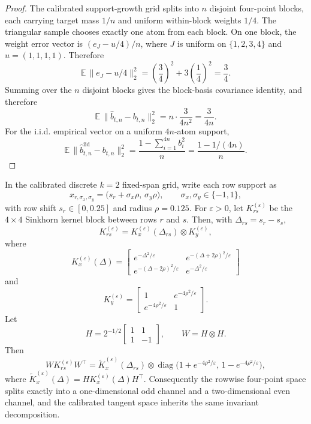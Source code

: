 \begin{proof}
The calibrated support-growth grid splits into $n$ disjoint four-point blocks,
each carrying target mass $1/n$ and uniform within-block weights $1/4$. The
triangular sample chooses exactly one atom from each block. On one block, the
weight error vector is $(e_J-u/4)/n$, where $J$ is uniform on
$\{1,2,3,4\}$ and $u=(1,1,1,1)$. Therefore
\[
  \mathbb E\,\bigl\|e_J-u/4\bigr\|_2^2
  = \left(\frac34\right)^2 + 3\left(\frac14\right)^2
  = \frac34.
\]
Summing over the $n$ disjoint blocks gives
the block-basis covariance identity, and therefore
\[
  \mathbb E\,\|\widehat b_{t,n}-b_{t,n}\|_2^2
  = n\cdot \frac{3}{4n^2}
  = \frac{3}{4n}.
\]
For the i.i.d. empirical vector on a uniform $4n$-atom support,
\[
  \mathbb E\,\|\widehat b_{t,n}^{\mathrm{iid}}-b_{t,n}\|_2^2
  = \frac{1-\sum_{i=1}^{4n} b_i^2}{n}
  = \frac{1-1/(4n)}{n}.
\]
\end{proof}

\begin{lemma}
\label{lem:calibrated_sinkhorn_parity_decomposition}
In the calibrated discrete $k=2$ fixed-span grid, write each row support as
\[
  x_{r,\sigma_x,\sigma_y}
  = \bigl(s_r+\sigma_x\rho,\,\sigma_y\rho\bigr),
  \qquad
  \sigma_x,\sigma_y\in\{-1,1\},
\]
with row shift $s_r\in[0,0.25]$ and radius $\rho=0.125$. For
$\varepsilon>0$, let $K_{rs}^{(\varepsilon)}$ be the $4\times 4$ Sinkhorn kernel
block between rows $r$ and $s$. Then, with $\Delta_{rs}=s_r-s_s$,
\[
  K_{rs}^{(\varepsilon)}
  = K_x^{(\varepsilon)}(\Delta_{rs})\otimes K_y^{(\varepsilon)},
\]
where
\[
  K_x^{(\varepsilon)}(\Delta)=
  \begin{bmatrix}
    e^{-\Delta^2/\varepsilon} & e^{-(\Delta+2\rho)^2/\varepsilon}\\
    e^{-(\Delta-2\rho)^2/\varepsilon} & e^{-\Delta^2/\varepsilon}
  \end{bmatrix}
\]
and
\[
  K_y^{(\varepsilon)}=
  \begin{bmatrix}
    1 & e^{-4\rho^2/\varepsilon}\\
    e^{-4\rho^2/\varepsilon} & 1
  \end{bmatrix}.
\]
Let
\[
  H=2^{-1/2}\begin{bmatrix}1&1\\1&-1\end{bmatrix},
  \qquad
  W=H\otimes H.
\]
Then
\[
  WK_{rs}^{(\varepsilon)}W^\top
  = \widetilde K_x^{(\varepsilon)}(\Delta_{rs})
    \otimes
    \operatorname{diag}\bigl(1+e^{-4\rho^2/\varepsilon},\,1-e^{-4\rho^2/\varepsilon}\bigr),
\]
where $\widetilde K_x^{(\varepsilon)}(\Delta)=H K_x^{(\varepsilon)}(\Delta)H^\top$.
Consequently the rowwise four-point space splits exactly into a one-dimensional
odd channel and a two-dimensional even channel, and the calibrated tangent space
inherits the same invariant decomposition.
\end{lemma}

